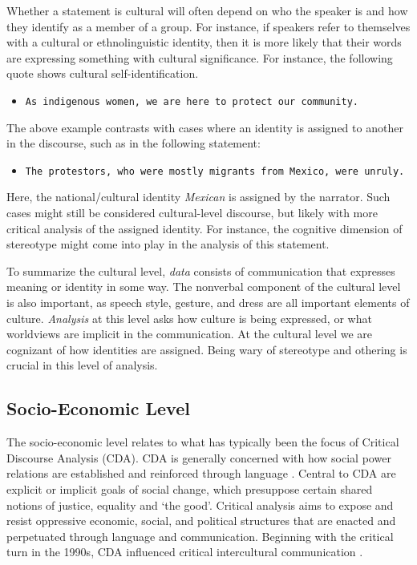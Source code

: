 Whether a statement is cultural will often depend on who the speaker is and how they identify as a member of a group. For instance, if speakers refer to themselves with a cultural or ethnolinguistic identity, then it is more likely that their words are expressing something with cultural significance. For instance, the following quote shows cultural self-identification.

\begin{footnotesize}
\begin{itemize}
    \item[-] \texttt{As indigenous women, we are here to protect our community.}
\end{itemize}
\end{footnotesize}

The above example contrasts with cases where an identity is assigned to another in the discourse, such as in the following statement:

\begin{footnotesize}
\begin{itemize}
    \item[-] \texttt{The protestors, who were mostly migrants from Mexico, were unruly.}
\end{itemize}
\end{footnotesize}

Here, the national/cultural identity \textit{Mexican} is assigned by the narrator. Such cases might still be considered cultural-level discourse, but likely with more critical analysis of the assigned identity. For instance, the cognitive dimension of stereotype might come into play in the analysis of this statement.

To summarize the cultural level, \textit{data} consists of communication that expresses meaning or identity in some way. The nonverbal component of the cultural level is also important, as speech style, gesture, and dress are all important elements of culture. \textit{Analysis} at this level asks how culture is being expressed, or what worldviews are implicit in the communication. At the cultural level we are cognizant of how identities are assigned. Being wary of stereotype and othering is crucial in this level of analysis.

\subsection{Socio-Economic Level}

The socio-economic level relates to what has typically been the focus of Critical Discourse Analysis (CDA). CDA is generally concerned with how social power relations are established and reinforced through language \citep{Fairclough1995}. Central to CDA are explicit or implicit goals of social change, which presuppose certain shared notions of justice, equality and `the good'. Critical analysis aims to expose and resist oppressive economic, social, and political structures that are enacted and perpetuated through language and communication. Beginning with the critical turn in the 1990s, CDA influenced critical intercultural communication \citep{Moon2011a}. 

